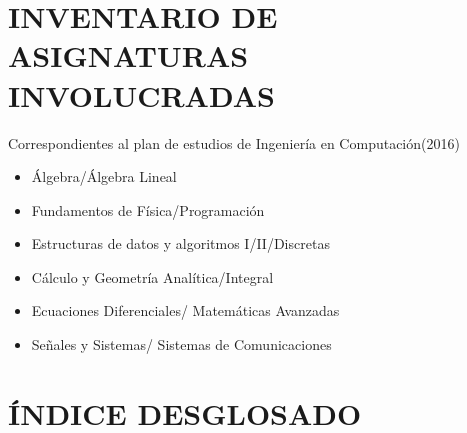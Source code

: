 \documentclass{book}
\begin{document}
	\section*{INVENTARIO DE ASIGNATURAS INVOLUCRADAS}
	Correspondientes al plan de estudios de Ingeniería en Computación(2016)
	\begin{itemize}
		\item Álgebra/Álgebra Lineal
		\item Fundamentos de Física/Programación
		\item Estructuras de datos y algoritmos I/II/Discretas
		\item Cálculo y Geometría Analítica/Integral
		\item Ecuaciones Diferenciales/ Matemáticas Avanzadas
		\item Señales y Sistemas/ Sistemas de Comunicaciones
	\end{itemize}
	\pagebreak\section*{ÍNDICE DESGLOSADO}
	\renewcommand{\theenumii}{\arabic{enumii}}
\end{document}

